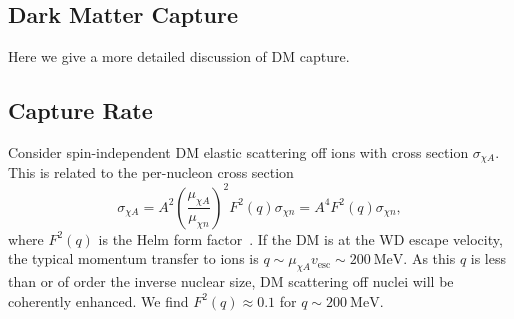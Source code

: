 \documentclass[preprintnumbers,amsmath,amssymb,prd,superscriptaddress]{revtex4}
\newcommand{\MeV}{\text{MeV}}
\def\r{\right)}
\def\l{\left(}
\begin{document}
\begin{appendices}
\section{Dark Matter Capture}
\label{sec:capture}
Here we give a more detailed discussion of DM capture. 

\subsection{Capture Rate}
Consider spin-independent DM elastic scattering off ions with cross section $\sigma_{\chi A}$.
This is related to the per-nucleon cross section
\begin{equation}
\sigma_{\chi A} = A^2 \l \frac{\mu_{\chi A}}{\mu_{\chi n}}\r^2 F^2(q) \sigma_{\chi n} = A^4 F^2(q) \sigma_{\chi n},
\end{equation}
where $F^2(q)$ is the Helm form factor~\cite{Helm:1956zz}.
If the DM is at the WD escape velocity, the typical momentum transfer to ions is $q \sim \mu_{\chi A} v_\text{esc} \sim 200 ~\MeV$. 
As this $q$ is less than or of order the inverse nuclear size, DM scattering off nuclei will be coherently enhanced. 
We find $F^2(q) \approx 0.1$ for $q \sim 200 ~\MeV$.


\end{appendices}
\end{document}
